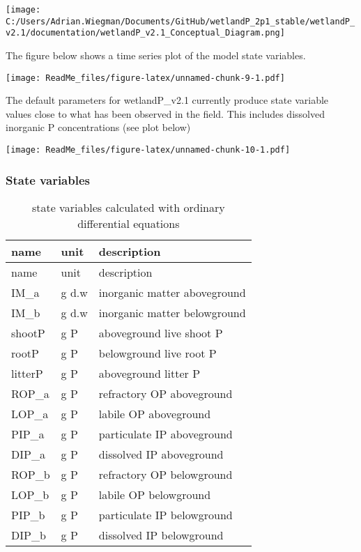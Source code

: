 \documentclass[
]{article}
\begin{document}
\texttt{[image: C:/Users/Adrian.Wiegman/Documents/GitHub/wetlandP\_2p1\_stable/wetlandP\_v2.1/documentation/wetlandP\_v2.1\_Conceptual\_Diagram.png]}

The figure below shows a time series plot of the model state variables.

\texttt{[image: ReadMe\_files/figure-latex/unnamed-chunk-9-1.pdf]}

The default parameters for wetlandP\_v2.1 currently produce state
variable values close to what has been observed in the field. This
includes dissolved inorganic P concentrations (see plot below)

\texttt{[image: ReadMe\_files/figure-latex/unnamed-chunk-10-1.pdf]}

\hypertarget{state-variables}{%
\subsubsection{State variables}\label{state-variables}}

\begin{longtable}[]{@{}lll@{}}
\caption{state variables calculated with ordinary differential
equations}\tabularnewline
\toprule\noalign{}
name & unit & description \\
\midrule\noalign{}
\endfirsthead
\toprule\noalign{}
name & unit & description \\
\midrule\noalign{}
\endhead
\bottomrule\noalign{}
\endlastfoot
IM\_a & g d.w & inorganic matter aboveground \\
IM\_b & g d.w & inorganic matter belowground \\
shootP & g P & aboveground live shoot P \\
rootP & g P & belowground live root P \\
litterP & g P & aboveground litter P \\
ROP\_a & g P & refractory OP aboveground \\
LOP\_a & g P & labile OP aboveground \\
PIP\_a & g P & particulate IP aboveground \\
DIP\_a & g P & dissolved IP aboveground \\
ROP\_b & g P & refractory OP belowground \\
LOP\_b & g P & labile OP belowground \\
PIP\_b & g P & particulate IP belowground \\
DIP\_b & g P & dissolved IP belowground \\
\end{longtable}
\end{document}
